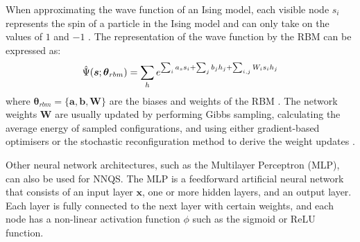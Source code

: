 When approximating the wave function of an Ising model, each visible node $s_i$ represents the spin of a particle in the Ising model and can only take on the values of $1$ and $-1$ \cite{b20}. The representation of the wave function by the RBM can be expressed as:
\begin{equation}
    \Hat{\Psi}(\boldsymbol{s} ; \boldsymbol{\theta}_{rbm}) = \sum_{h} e^{\sum_i a_s s_i + \sum_j b_j h_j + \sum_{i,j}W_i s_i h_j} 
\end{equation}
where $\boldsymbol{\theta}_{rbm} = \{\boldsymbol{a}, \boldsymbol{b}, \boldsymbol{W}\}$ are the biases and weights of the RBM \cite{b20}. The network weights $\mathbf{W}$ are usually updated by performing Gibbs sampling, calculating the average energy of sampled configurations, and using either gradient-based optimisers or the stochastic reconfiguration method to derive the weight updates \cite{b25}.

Other neural network architectures, such as the Multilayer Perceptron (MLP), can also be used for NNQS. The MLP is a feedforward artificial neural network that consists of an input layer $\boldsymbol{x}$, one or more hidden layers, and an output layer. Each layer is fully connected to the next layer with certain weights, and each node has a non-linear activation function $\phi$ such as the sigmoid or ReLU function. 

